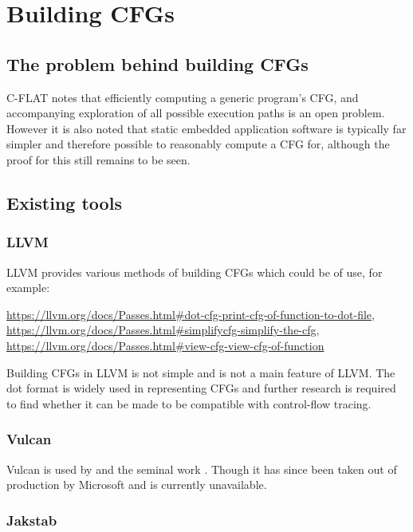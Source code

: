 \section{Building CFGs}

\subsection{The problem behind building CFGs}

C-FLAT \cite{Abera2016} notes that efficiently computing a generic program's CFG, and accompanying exploration of all possible execution paths is an open problem. However it is also noted that static embedded application software is typically far simpler and therefore possible to reasonably compute a CFG for, although the proof for this still remains to be seen.

\subsection{Existing tools}

\subsubsection{LLVM}

LLVM provides various methods of building CFGs which could be of use, for example:

\url{https://llvm.org/docs/Passes.html#dot-cfg-print-cfg-of-function-to-dot-file},
\url{https://llvm.org/docs/Passes.html#simplifycfg-simplify-the-cfg},
\url{https://llvm.org/docs/Passes.html#view-cfg-view-cfg-of-function}

Building CFGs in LLVM is not simple and is not a main feature of LLVM. The dot format is widely used in representing CFGs and further research is required to find whether it can be made to be compatible with control-flow tracing.

\subsubsection{Vulcan}

Vulcan \cite{Edwards2001} is used by \cite{Davi2012} and the seminal work \cite{Abadi2005}. Though it has since been taken out of production by Microsoft and is currently unavailable.

\subsubsection{Jakstab}

